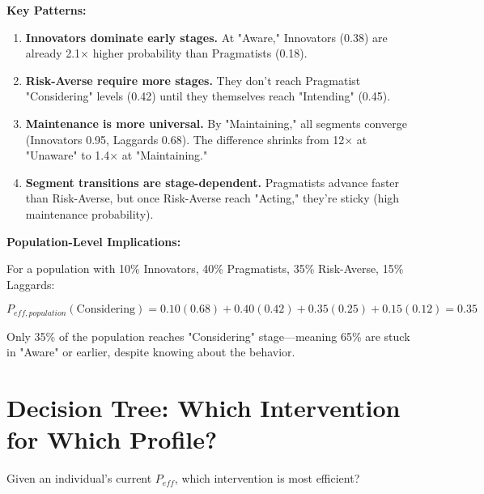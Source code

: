 \textbf{Key Patterns:}

\begin{enumerate}

\item \textbf{Innovators dominate early stages.} At "Aware," Innovators (0.38) are already 2.1× higher probability than Pragmatists (0.18).

\item \textbf{Risk-Averse require more stages.} They don't reach Pragmatist "Considering" levels (0.42) until they themselves reach "Intending" (0.45).

\item \textbf{Maintenance is more universal.} By "Maintaining," all segments converge (Innovators 0.95, Laggards 0.68). The difference shrinks from 12× at "Unaware" to 1.4× at "Maintaining."

\item \textbf{Segment transitions are stage-dependent.} Pragmatists advance faster than Risk-Averse, but once Risk-Averse reach "Acting," they're sticky (high maintenance probability).

\end{enumerate}

\textbf{Population-Level Implications:}

For a population with 10\% Innovators, 40\% Pragmatists, 35\% Risk-Averse, 15\% Laggards:

\begin{equation}
P_{eff,population}(\text{Considering}) = 0.10(0.68) + 0.40(0.42) + 0.35(0.25) + 0.15(0.12) = 0.35
\end{equation}

Only 35\% of the population reaches "Considering" stage—meaning 65\% are stuck in "Aware" or earlier, despite knowing about the behavior.

\section{Decision Tree: Which Intervention for Which Profile?}\label{sec:ch16-tree}

Given an individual's current $P_{eff}$, which intervention is most efficient?

